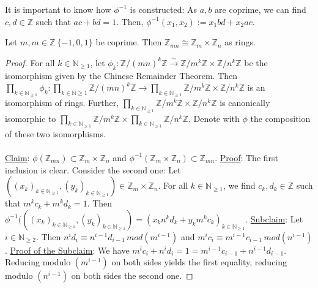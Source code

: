 It is important to know how $\phi ^{-1}$ is constructed: \newline
As $a,b$ are coprime, we can find $c,d \in \mathbb{Z}$ such that $ac + bd = 1$. Then, $\phi ^{-1} (x_1, x_2) := x_1 bd + x_2 ac$.

\begin{theorem}
Let $m,m \in \mathbb{Z} \ \{ -1, 0, 1 \}$ be coprime. Then $\mathbb{Z}_{mn} \cong \mathbb{Z}_m \times \mathbb{Z}_n$ as rings.
\end{theorem}

\begin{proof}
For all $k \in \mathbb{N}_{ \geq 1}$, let $\phi_k: \mathbb{Z} /(mn)^k \mathbb{Z} \xrightarrow{\sim } \mathbb{Z} / m^k \mathbb{Z} \times \mathbb{Z} / n^k \mathbb{Z} $ be the isomorphism given by the Chinese Remainder Theorem. Then $\prod_{k \in \mathbb{N}_ {\geq 1}} \phi_k : \prod_{k \in \mathbb{N} \geq 1 } \mathbb{Z} / (mn)^k \mathbb{Z} \rightarrow \prod _{k \in \mathbb{N}_{ \geq 1} } \mathbb{Z} / m^k \mathbb{Z} \times \mathbb{Z} / n^k \mathbb{Z} $ is an isomorphism of rings. Further, $\prod _{k \in \mathbb{N}_{ \geq 1} } \mathbb{Z} / m^k \mathbb{Z} \times \mathbb{Z} / n^k \mathbb{Z} $ is canonically isomorphic to $\prod _{k \in \mathbb{N}_{ \geq 1} } \mathbb{Z} / m^k \mathbb{Z} \times \prod _{k \in \mathbb{N}_{ \geq 1} } \mathbb{Z} / n^k \mathbb{Z} $. Denote with $\phi$ the composition of these two isomorphisms. \\~\\
\underline{Claim}: $\phi( \mathbb{Z}_{mn} ) \subset \mathbb{Z}_m \times \mathbb{Z}_n$ and $\phi^{-1} (\mathbb{Z}_m \times \mathbb{Z}_n) \subset \mathbb{Z}_{mn}$. \newline
\underline{Proof}: The first inclusion is clear. Consider the second one: Let $( (x_k)_{ k \in \mathbb{N}_{\geq 1 } },(y_k)_{ k \in \mathbb{N}_{\geq 1 } }) \in \mathbb{Z}_m \times \mathbb{Z}_n$. For all $k \in \mathbb{N}_{ \geq 1 }$, we find $ c_k, d_k \in \mathbb{Z}$ such that $m^k c_k + m^k d_k = 1$. Then $\phi ^{-1} (( (x_k)_{ k \in \mathbb{N}_{\geq 1 } },(y_k)_{ k \in \mathbb{N}_{\geq 1 } }) = (x_k n^k d_k + y_k m^k c_k)_{k \in \mathbb{N}_{ \geq 1 } }$. \newline 
\underline{Subclaim}: Let $i \in \mathbb{N}_{\geq 2}$. Then $n^i d_i \equiv n^{i-1} d_{i-1} \, mod (m^{i-1})$ and $m^i c_i \equiv m^{i-1} c_{i-1} \, mod(n^{i-1} )$. \newline
\underline{Proof of the Subclaim}: We have $m^i c_i + n^i d_i = 1 = m^{i-1} c_{i-1} + n^{i-1} d_{i-1}$. Reducing modulo $(m^{i-1} )$ on both sides yields the first equality, reducing modulo $(n^{i-1})$ on both sides the second one.\newline

\end{proof}
